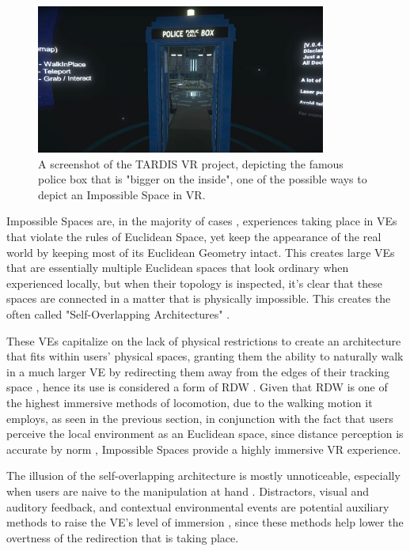 \begin{figure}[b]
    \centering
    \includegraphics[width=0.85\textwidth]{NOVAthesisFiles/Images/papers/tardis.png}
    \caption{A screenshot of the TARDIS VR project, depicting the famous police box that is "bigger on the inside", one of the possible ways to 
    depict an Impossible Space in \gls{VR}.}
    \label{fig:tardis}
\end{figure}

Impossible Spaces are, in the majority of cases \cite{Lochner2021}, experiences taking place in \glspl{VE} that violate the rules of Euclidean 
Space, yet keep the appearance of the real world by keeping most of its Euclidean Geometry intact. This creates large \glspl{VE} that are essentially 
multiple Euclidean spaces that look ordinary when experienced locally, but when their topology is inspected, it's clear that
these spaces are connected in a matter that is physically impossible. This creates the often called "Self-Overlapping Architectures" \cite{Lochner2021, Suma2012}.

These \glspl{VE} capitalize on the lack of physical restrictions to create an architecture that fits within users' physical spaces,
granting them the ability to naturally walk in a much larger \gls{VE} by
redirecting them away from the edges of their tracking space \cite{Fisher2017, Suma2012, 6550194}, 
hence its use is considered a form of \gls{RDW} \cite{8255772}.
Given that \gls{RDW} is one of the highest immersive methods of locomotion, due to the walking motion it employs, 
as seen in the previous  section, 
in conjunction with the fact that users perceive the local environment as an Euclidean space, since distance 
perception is accurate by norm \cite{Barwulor2020}, Impossible Spaces provide a highly immersive \gls{VR} experience. 

The illusion of the self-overlapping architecture is mostly unnoticeable, especially when users are naive to the manipulation at hand 
\cite{Suma2012}. Distractors, visual and auditory feedback, and contextual environmental events are potential auxiliary methods to 
raise the \gls{VE}'s level of immersion \cite{Ciumedean2020,Fisher2017}, since these methods help lower the overtness of the redirection that is 
taking place.

